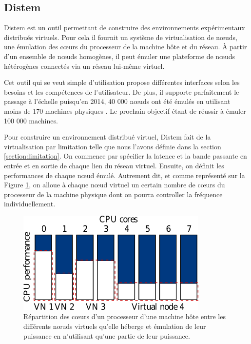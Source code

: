 \subsection{Distem}
\label{subsection:Distem}

Distem \citep{DISTEM} est un outil permettant de construire des
environnements expérimentaux distribués virtuels. Pour cela il fournit un
système de virtualisation de n\oe uds, une émulation des c\oe urs du processeur
de la machine hôte et du réseau. À partir d'un ensemble de n\oe uds homogènes,
il peut émuler une plateforme de n\oe uds hétérogènes connectés via un réseau
lui-même virtuel.

Cet outil qui se veut simple d'utilisation propose différentes interfaces selon
les besoins et les compétences de l'utilisateur. De plus, il supporte
parfaitement le passage à l'échelle puisqu'en 2014, 40 000 n\oe uds ont été
émulés en utilisant moins de 170 machines physiques \citep{DISTEM_buchert2014emulation}. Le prochain objectif étant de réussir à
émuler 100 000 machines.

Pour construire un environnement distribué virtuel, Distem fait de la
virtualisation par limitation telle que nous l'avons définie dans la section
\ref{section:limitation}. On commence par spécifier la latence et la bande
passante en entrée et en sortie de chaque lien du réseau virtuel. Ensuite, on
définit les performances de chaque n\oe ud émulé. Autrement dit, et comme
représenté sur la Figure \ref{Distem_core}, on alloue à chaque n\oe ud virtuel
un certain nombre de c\oe urs du processeur de la machine physique dont on
pourra controller la fréquence individuellement.

\begin{figure}
  \centering
  \includegraphics[scale=0.70]{Pictures/png/Distem_repartion_coeurs_v1}
  \caption[Répartition des c\oe urs d'un processeur d'une machine hôte]{Répartition des c\oe urs d'un processeur d'une machine hôte entre les différents n\oe uds virtuels qu'elle héberge et émulation de leur puissance en n'utilisant qu'une partie de leur puissance.}
  \label{Distem_core}
\end{figure}
  
